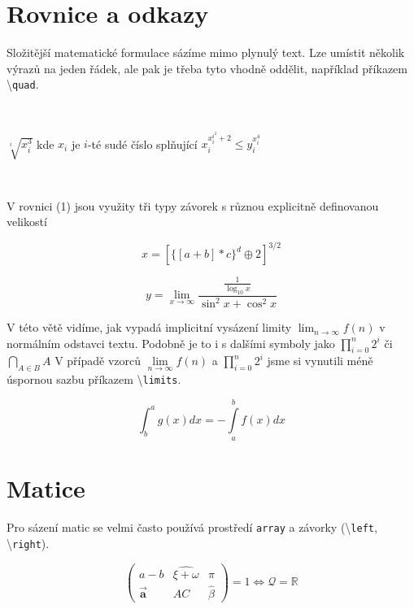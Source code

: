 \documentclass[a4paper, twocolumn, 10pt]{article}
\begin{document}
\section{Rovnice a odkazy}

Složitější matematické formulace sázíme mimo plynulý
text. Lze umístit několik výrazů na jeden řádek, ale pak je
třeba tyto vhodně oddělit, například příkazem \textbackslash \texttt{quad}.

~\

$\sqrt[i]{x_i^3}$ kde $x_i$ je $i$-té sudé číslo splňující \quad $x_i^{x_i^{i^2} + 2} \leq y_i^{x_i^4}$

~\

V rovnici (1) jsou využity tři typy závorek s různou explicitně definovanou velikostí

\begin{equation}
x = [ \{ [ a + b]\ast c\}^d \oplus 2]^{3/2}
\end{equation}

\begin{equation}\nonumber
y = \lim\limits_{x \rightarrow \infty}\frac{\frac{1}{\log_{10} x}}{\sin^{2}x + \cos^{2}x}
\end{equation}

V této větě vidíme, jak vypadá implicitní vysázení limity $\lim_{n \rightarrow \infty} f(n)$ v normálním odstavci textu. Podobně je to i s dalšími symboly jako $\prod _{i=0}^n 2^i$ či $\bigcap_{A\in B}A$ V případě vzorců $ \lim\limits_{n \rightarrow \infty} f(n)$ a $\prod\limits _{i=0}^n 2^i$
jsme si vynutili méně
úspornou sazbu příkazem \textbackslash \texttt{limits}.

\begin{equation}
\int_b^a g(x)dx = -\int\limits_a^b f(x)dx
\end{equation}

\section{Matice}
Pro sázení matic se velmi často používá prostředí \texttt{array} a závorky (\textbackslash \texttt{left}, \textbackslash \texttt{right}).

\begin{equation}\nonumber
\left(\begin{array}{ccc}
    a - b &  \widehat{\xi + \omega} & \pi \\
    \vec{\mathbf{a}} & AC & \hat{\beta}
\end{array}\right)
= 1 \Longleftrightarrow\mathcal{Q} = \mathds{R}
\end{equation}
\end{document}
